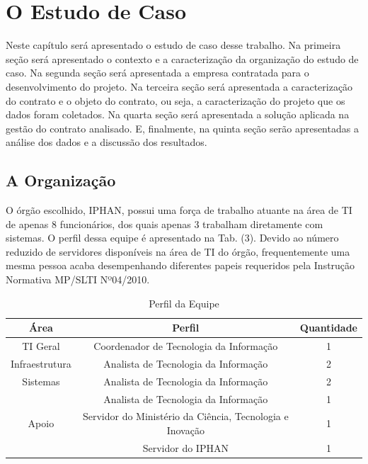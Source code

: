 \chapter[O Estudo de Caso]{O Estudo de Caso}

Neste capítulo será apresentado o estudo de caso desse trabalho. Na primeira seção será apresentado o contexto e a caracterização da organização do estudo de caso. Na segunda seção será apresentada a empresa contratada para o desenvolvimento do projeto. Na terceira seção será apresentada a caracterização do contrato e o objeto do contrato, ou seja, a caracterização do projeto que os dados foram coletados. Na quarta seção será apresentada a solução aplicada na gestão do contrato analisado. E, finalmente, na quinta seção serão apresentadas a análise dos dados e a discussão dos resultados.

\section[A Organização]{A Organização}

O órgão escolhido, IPHAN, possui uma força de trabalho atuante na área de TI de apenas 8 funcionários, dos quais apenas 3 trabalham diretamente com sistemas. O perfil dessa equipe é apresentado na Tab. (3). Devido ao número reduzido de servidores disponíveis na área de TI do órgão, frequentemente uma mesma pessoa acaba desempenhando diferentes papeis requeridos pela Instrução Normativa MP/SLTI Nº04/2010.

\begin{table}[H]
\center
\footnotesize
\begin{tabular}{|c|c|c|}
\hline
\textbf{Área}          & \textbf{Perfil}   & \textbf{Quantidade} \\ \hline
TI Geral               & Coordenador de Tecnologia da Informação   & 1                   \\ \hline
Infraestrutura         & Analista de Tecnologia da Informação   & 2                   \\ \hline
Sistemas               & Analista de Tecnologia da Informação   & 2                   \\ \hline
\multirow{3}{*}{Apoio} & Analista de Tecnologia da Informação    & 1                   \\ \cline{2-3} 
\multicolumn{1}{|l|}{} & Servidor do Ministério da Ciência, Tecnologia e Inovação & 1                   \\ \cline{2-3} 
\multicolumn{1}{|l|}{} & Servidor do IPHAN & 1                   \\ \hline
\end{tabular}
\caption{Perfil da Equipe}
\end{table}

